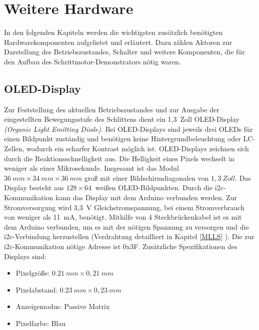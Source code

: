 %
%
%

\chapter{Weitere Hardware}

In den folgenden Kapiteln werden die wichtigsten zusätzlich benötigten Hardwarekomponenten aufgelistet und erläutert. Dazu zählen Aktoren zur Darstellung des Betriebszustandes, Schalter und weitere Komponenten, die für den Aufbau des Schrittmotor-Demonstrators nötig waren.  

\section{OLED-Display}

Zur Feststellung des aktuellen Betriebszustandes und zur Ausgabe der eingestellten Bewegungsstufe des Schlittens dient ein 1,3\ Zoll OLED-Display \emph{(Organic Light Emitting Diode)}. Bei OLED-Displays sind jeweils drei OLEDs für einen Bildpunkt zuständig und benötigen keine Hintergrundbeleuchtung oder LC-Zellen, wodurch ein scharfer Kontrast möglich ist. OLED-Displays zeichnen sich durch die Reaktionsschnelligkeit aus. Die Helligkeit eines Pixels wechselt in weniger als einer Mikrosekunde.\cite{DieterStotz.2019} Insgesamt ist das Modul $36 \ mm \times 34  \ mm \times36 \ mm$ groß mit einer Bildschirmdiagonalen von $1,3\ Zoll $. Das Display besteht aus $128 \times 64 \ $ weißen OLED-Bildpunkten. Durch die \ac{i2c}-Kommunikation kann das Display mit dem Arduino verbunden werden. Zur Stromversorgung wird  3,3\ V Gleichstromspannung, bei einem Stromverbrauch von weniger als 11\ mA, benötigt. Mithilfe von 4 Steckbrückenkabel ist es mit dem Arduino verbunden, um es mit der nötigen Spannung zu versorgen und die \ac{i2c}-Verbindung herzustellen (Verdrahtung detailliert in Kapitel \ref{MLLS} ). Die zur \ac{i2c}-Kommunikation nötige Adresse ist 0x3F. 
Zusätzliche Spezifikationen des Displays sind: 
	\begin{itemize}
		\item Pixelgröße: $0.21 \ mm \times 0,21 \ mm $
		\item Pixelabstand: $0.23 \ mm \times 0,23 \ mm $
		\item Anzeigemodus: Passive Matrix
		\item Pixelfarbe: Blau
	\end{itemize}
\cite{AZDelivery.2024}

